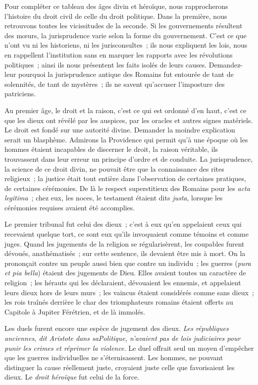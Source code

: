 \documentclass[french,twoside]{book} %
\begin{document}
\par
Pour compléter ce tableau des âges divin et héroïque, nous rapprocherons l’histoire du droit civil de celle du droit politique. Dans la première, nous retrouvons toutes les vicissitudes de la seconde. Si les gouvernements résultent des mœurs, la jurisprudence varie selon la forme du gouvernement. C’est ce que n’ont vu ni les historiens, ni les jurisconsultes ; ils nous expliquent les lois, nous en rappellent l’institution sans en marquer les rapports  avec les révolutions politiques ; ainsi ils nous présentent les faits isolés de leurs causes. Demandez-leur pourquoi la jurisprudence antique des Romains fut entourée de tant de solennités, de tant de mystères ; ils ne savent qu’accuser l’imposture des patriciens.\par
Au premier âge, le droit et la raison, c’est ce qui est ordonné d’en haut, c’est ce que les dieux ont révélé par les auspices, par les oracles et autres signes matériels. Le droit est fondé sur une autorité divine. Demander la moindre explication serait un blasphème. Admirons la Providence qui permit qu’à une époque où les hommes étaient incapables de discerner le droit, la raison véritable, ils trouvassent dans leur erreur un principe d’ordre et de conduite. La jurisprudence, la science de ce droit divin, ne pouvait être que la connaissance des rites religieux ; la justice était tout entière dans l’observation de certaines pratiques, de certaines cérémonies. De là le respect superstitieux des Romains pour les {\itshape acta legitima} ; chez eux, les noces, le testament étaient dits {\itshape justa}, lorsque les cérémonies requises avaient été accomplies.\par
Le premier tribunal fut celui des dieux ; c’est à eux qu’en appelaient ceux qui recevaient quelque tort, ce sont eux qu’ils invoquaient comme témoins et comme juges. Quand les jugements de la religion  se régularisèrent, les coupables furent dévoués, anathématisés ; sur cette sentence, ils devaient être mis à mort. On la prononçait contre un peuple aussi bien que contre un individu ; les guerres ({\itshape pura et pia bella}) étaient des jugements de Dieu. Elles avaient toutes un caractère de religion ; les hérauts qui les déclaraient, dévouaient les ennemis, et appelaient leurs dieux hors de leurs murs ; les vaincus étaient considérés comme sans dieux ; les rois traînés derrière le char des triomphateurs romains étaient offerts au Capitole à Jupiter Férétrien, et de là immolés.\par
Les duels furent encore une espèce de jugement des dieux. \emph{{\itshape Les républiques anciennes}, dit Aristote dans sa{\itshape  Politique, n’avaient pas de lois judiciaires pour punir les crimes et réprimer la violence.}} Le duel offrait seul un moyen d’empêcher que les guerres individuelles ne s’éternisassent. Les hommes, ne pouvant distinguer la cause réellement juste, croyaient juste celle que favorisaient les dieux. Le {\itshape droit héroïque} fut celui de la force.\par
\end{document}
